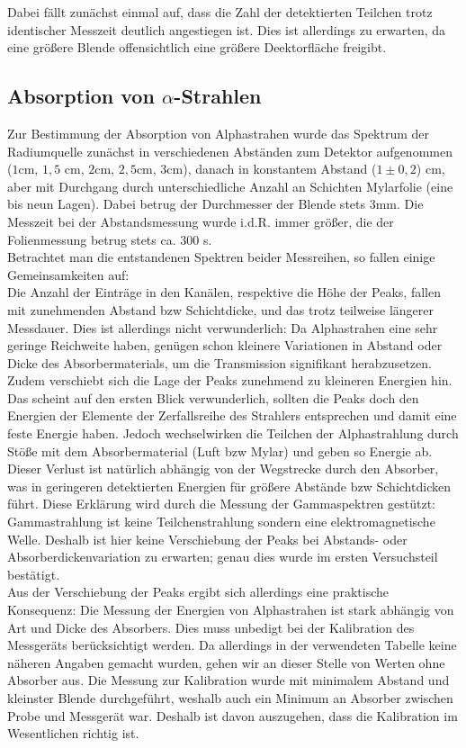 Dabei fällt zunächst einmal auf, dass die Zahl der detektierten Teilchen trotz identischer Messzeit deutlich angestiegen ist. Dies ist 
allerdings zu erwarten, da eine größere Blende offensichtlich eine größere Deektorfläche freigibt.


\subsection{Absorption von $\alpha$-Strahlen}
\label{subs:abs}

Zur Bestimmung der Absorption von Alphastrahen wurde das Spektrum der Radiumquelle zunächst in verschiedenen Abständen zum Detektor 
aufgenommen ($1$cm, $1,5$ cm, $2$cm, $2,5$cm, $3$cm), danach in konstantem Abstand ($1 \pm 0,2$) cm, aber mit Durchgang durch 
unterschiedliche Anzahl an Schichten Mylarfolie (eine bis neun Lagen). 
Dabei betrug der Durchmesser der Blende stets $3$mm. Die Messzeit bei der Abstandsmessung wurde i.d.R. immer größer, die der 
Folienmessung betrug stets ca. $300$ s.\\

Betrachtet man die entstandenen Spektren beider Messreihen, so fallen einige Gemeinsamkeiten auf:\\
Die Anzahl der Einträge in den Kanälen, respektive die Höhe der Peaks, fallen mit zunehmenden Abstand bzw Schichtdicke, und das trotz 
teilweise längerer Messdauer. Dies ist allerdings nicht verwunderlich: Da Alphastrahen eine sehr geringe Reichweite haben, genügen schon 
kleinere Variationen in Abstand oder Dicke des Absorbermaterials, um die Transmission signifikant herabzusetzen.\\
Zudem verschiebt sich die Lage der Peaks zunehmend zu kleineren Energien hin. Das scheint auf den ersten Blick verwunderlich, sollten 
die Peaks doch den Energien der Elemente der Zerfallsreihe des Strahlers entsprechen und damit eine feste Energie haben. Jedoch 
wechselwirken die Teilchen der Alphastrahlung durch Stöße mit dem Absorbermaterial (Luft bzw Mylar) und geben so Energie ab. Dieser 
Verlust ist natürlich abhängig von der Wegstrecke durch den Absorber, was in geringeren detektierten Energien für größere Abstände 
bzw Schichtdicken führt. Diese Erklärung wird durch die Messung der Gammaspektren gestützt: Gammastrahlung ist keine Teilchenstrahlung 
sondern eine elektromagnetische Welle. Deshalb ist hier keine Verschiebung der Peaks bei Abstands- oder Absorberdickenvariation zu 
erwarten; genau dies wurde im ersten Versuchsteil bestätigt.\\
Aus der Verschiebung der Peaks ergibt sich allerdings eine praktische Konsequenz: Die Messung der Energien von Alphastrahen ist stark 
abhängig von Art und Dicke des Absorbers. Dies muss unbedigt bei der Kalibration des Messgeräts berücksichtigt werden. Da allerdings 
in der verwendeten Tabelle keine näheren Angaben gemacht wurden, gehen wir an dieser Stelle von Werten ohne Absorber aus. Die Messung 
zur Kalibration wurde mit minimalem Abstand und kleinster Blende durchgeführt, weshalb auch ein Minimum an Absorber zwischen Probe 
und Messgerät war. Deshalb ist davon auszugehen, dass die Kalibration im Wesentlichen richtig ist.\\

